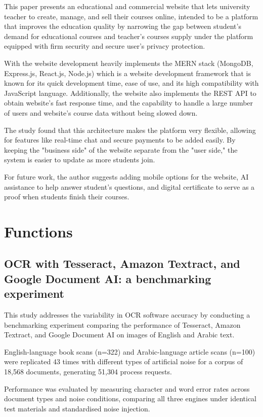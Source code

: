 This paper presents an educational and commercial website that lets university teacher to create, manage, and sell their courses online, intended to be a platform that improves the education quality by narrowing the gap between student's demand for educational courses and teacher's courses supply under the platform equipped with firm security and secure user's privacy protection.

With the website development heavily implements the MERN stack (MongoDB, Express.js, React.js, Node.js) which is a website development framework that is known for its quick development time, ease of use, and its high compatibility with JavaScript language. Additionally, the website also implements the REST API to obtain website's fast response time, and the capability to handle a large number of users and website's course data without being slowed down.

The study found that this architecture makes the platform very flexible, allowing for features like real-time chat and secure payments to be added easily. By keeping the "business side" of the website separate from the "user side," the system is easier to update as more students join.

For future work, the author suggests adding mobile options for the website, AI assistance to help answer student's questions, and digital certificate to serve as a proof when students finish their courses.


\section{Functions}


\subsection{OCR with Tesseract, Amazon Textract, and Google Document AI: a benchmarking experiment \cite{paper_16}}
This study addresses the variability in OCR software accuracy by conducting a benchmarking experiment comparing the performance of Tesseract, Amazon Textract, and Google Document AI on images of English and Arabic text. 

English-language book scans (n=322) and Arabic-language article scans (n=100) were replicated 43 times with different types of artificial noise for a corpus of 18,568 documents, generating 51,304 process requests. 

Performance was evaluated by measuring character and word error rates across document types and noise conditions, comparing all three engines under identical test materials and standardised noise injection.

